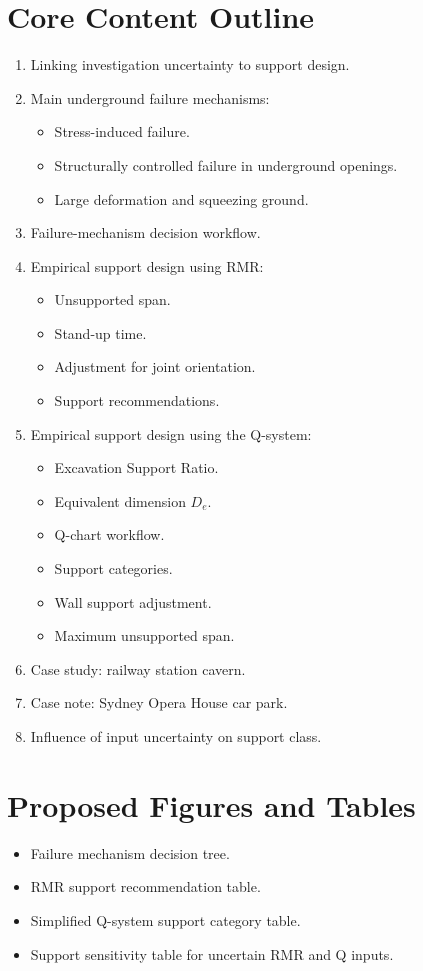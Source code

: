 \documentclass[12pt,oneside]{book}
\begin{document}
\section{Core Content Outline}
\begin{enumerate}
    \item Linking investigation uncertainty to support design.
    \item Main underground failure mechanisms:
    \begin{itemize}
        \item Stress-induced failure.
        \item Structurally controlled failure in underground openings.
        \item Large deformation and squeezing ground.
    \end{itemize}
    \item Failure-mechanism decision workflow.
    \item Empirical support design using RMR:
    \begin{itemize}
        \item Unsupported span.
        \item Stand-up time.
        \item Adjustment for joint orientation.
        \item Support recommendations.
    \end{itemize}
    \item Empirical support design using the Q-system:
    \begin{itemize}
        \item Excavation Support Ratio.
        \item Equivalent dimension \(D_e\).
        \item Q-chart workflow.
        \item Support categories.
        \item Wall support adjustment.
        \item Maximum unsupported span.
    \end{itemize}
    \item Case study: railway station cavern.
    \item Case note: Sydney Opera House car park.
    \item Influence of input uncertainty on support class.
\end{enumerate}

\section{Proposed Figures and Tables}
\begin{itemize}
    \item Failure mechanism decision tree.
    \item RMR support recommendation table.
    \item Simplified Q-system support category table.
    \item Support sensitivity table for uncertain RMR and Q inputs.
\end{itemize}
\end{document}
